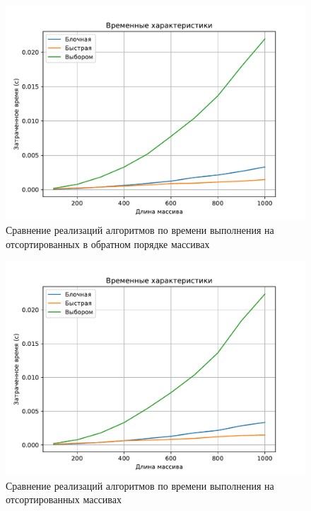 \newpage

\begin{figure}[H]
	\centering
	\includegraphics[scale=0.62]{assets/plots/cpu-reversed.pdf}
	\caption{Сравнение реализаций алгоритмов по времени выполнения на отсортированных в обратном порядке массивах}
	\label{pic:reversed}
\end{figure}

\newpage

\begin{figure}[H]
	\centering
	\includegraphics[scale=0.62]{assets/plots/cpu-sorted.pdf}
	\caption{Сравнение реализаций алгоритмов по времени выполнения на отсортированных массивах}
	\label{pic:sorted}
\end{figure}

\clearpage


